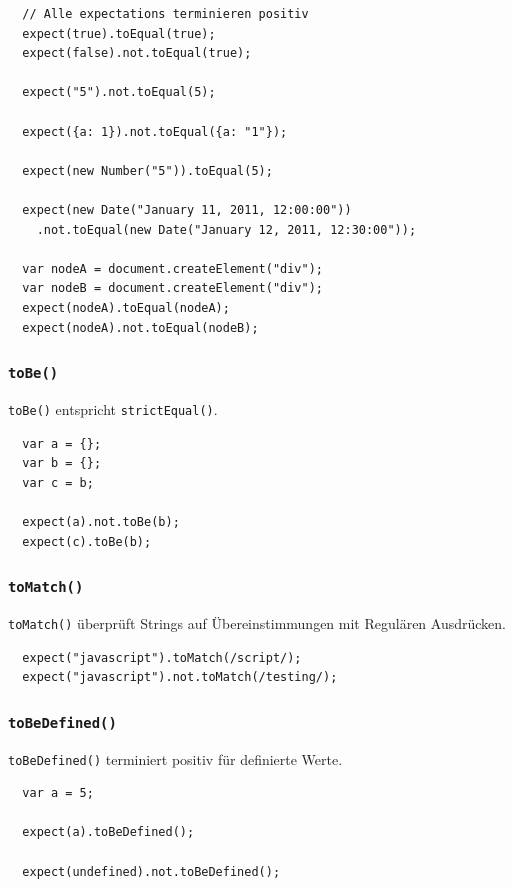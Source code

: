 \documentclass[11pt, a4paper]{article}
\begin{document}
\begin{verbatim}
  // Alle expectations terminieren positiv
  expect(true).toEqual(true);
  expect(false).not.toEqual(true);

  expect("5").not.toEqual(5);

  expect({a: 1}).not.toEqual({a: "1"});

  expect(new Number("5")).toEqual(5);

  expect(new Date("January 11, 2011, 12:00:00"))
    .not.toEqual(new Date("January 12, 2011, 12:30:00"));

  var nodeA = document.createElement("div");
  var nodeB = document.createElement("div");
  expect(nodeA).toEqual(nodeA);
  expect(nodeA).not.toEqual(nodeB);
\end{verbatim}

\subsubsection*{\texttt{toBe()}}

\texttt{toBe()} entspricht \texttt{strictEqual()}.

\begin{verbatim}
  var a = {};
  var b = {};
  var c = b;

  expect(a).not.toBe(b);
  expect(c).toBe(b);
\end{verbatim}

\subsubsection*{\texttt{toMatch()}}

\texttt{toMatch()} überprüft Strings auf Übereinstimmungen mit Regulären
Ausdrücken.

\begin{verbatim}
  expect("javascript").toMatch(/script/);
  expect("javascript").not.toMatch(/testing/);
\end{verbatim}

\subsubsection*{\texttt{toBeDefined()}}

\texttt{toBeDefined()} terminiert positiv für definierte Werte.

\begin{verbatim}
  var a = 5;

  expect(a).toBeDefined();

  expect(undefined).not.toBeDefined();
\end{verbatim}
\end{document}
